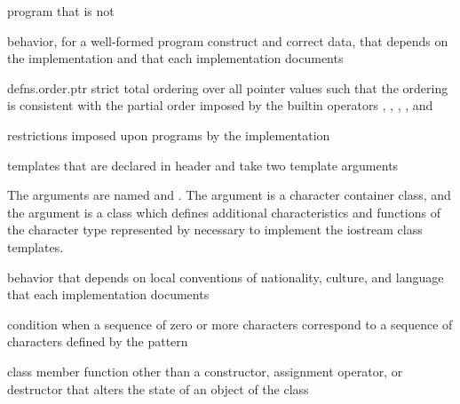 %
program that is not 

%
behavior, for a well-formed program construct and correct data, that
depends on the implementation and that each implementation documents

{defns.order.ptr}
%
strict total ordering over all pointer values
such that the ordering is consistent with the partial order
imposed by the builtin operators
\tcode{<}, \tcode{>}, \tcode{<=}, \tcode{>=}, and \tcode{<=>}

%
restrictions imposed upon programs by the implementation

templates that are declared in header  and
take two template arguments

\begin{defnote}
The arguments are named  and .
The argument  is a character container class, and
the argument  is a class
which defines additional characteristics and functions
of the character type represented by 
necessary to implement the iostream class templates.
\end{defnote}

%
behavior that depends on local conventions of nationality, culture, and
language that each implementation documents

%
%
condition when a sequence of zero or more characters
correspond to a sequence of characters defined by the pattern

%
class member function other than a constructor,
assignment operator, or destructor
that alters the state of an object of the class

